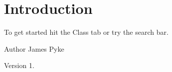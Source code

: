 \hypertarget{index_intro_sec}{}\section{Introduction}\label{index_intro_sec}
To get started hit the Class tab or try the search bar.

\begin{DoxyAuthor}{Author}
James Pyke 
\end{DoxyAuthor}
\begin{DoxyVersion}{Version}
1. 
\end{DoxyVersion}
